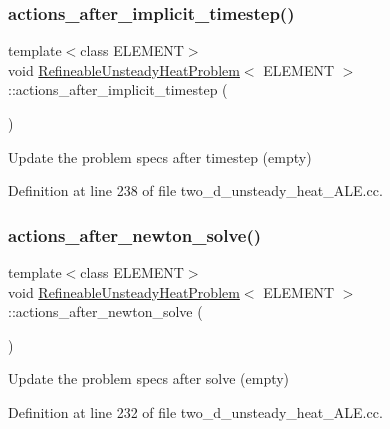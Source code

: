 \subsubsection{\texorpdfstring{actions\+\_\+after\+\_\+implicit\+\_\+timestep()}{actions\_after\_implicit\_timestep()}}
{\footnotesize\ttfamily template$<$class E\+L\+E\+M\+E\+NT$>$ \\
void \hyperlink{classRefineableUnsteadyHeatProblem}{Refineable\+Unsteady\+Heat\+Problem}$<$ E\+L\+E\+M\+E\+NT $>$\+::actions\+\_\+after\+\_\+implicit\+\_\+timestep (\begin{DoxyParamCaption}{ }\end{DoxyParamCaption})\hspace{0.3cm}{\ttfamily [inline]}}



Update the problem specs after timestep (empty) 



Definition at line 238 of file two\+\_\+d\+\_\+unsteady\+\_\+heat\+\_\+\+A\+L\+E.\+cc.

\mbox{\label{classRefineableUnsteadyHeatProblem_ada522772b79e92a75edf3724d0a273da}} 
\subsubsection{\texorpdfstring{actions\+\_\+after\+\_\+newton\+\_\+solve()}{actions\_after\_newton\_solve()}}
{\footnotesize\ttfamily template$<$class E\+L\+E\+M\+E\+NT$>$ \\
void \hyperlink{classRefineableUnsteadyHeatProblem}{Refineable\+Unsteady\+Heat\+Problem}$<$ E\+L\+E\+M\+E\+NT $>$\+::actions\+\_\+after\+\_\+newton\+\_\+solve (\begin{DoxyParamCaption}{ }\end{DoxyParamCaption})\hspace{0.3cm}{\ttfamily [inline]}}



Update the problem specs after solve (empty) 



Definition at line 232 of file two\+\_\+d\+\_\+unsteady\+\_\+heat\+\_\+\+A\+L\+E.\+cc.

